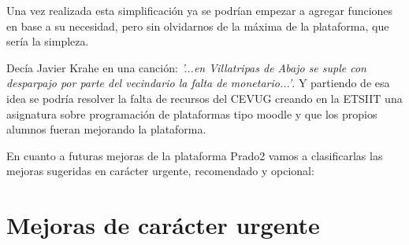 \bigskip
Una vez realizada esta simplificación ya se podrían empezar a agregar funciones en base a su necesidad, pero sin olvidarnos de la máxima de la plataforma, que sería la simpleza. 

\bigskip
Decía Javier Krahe en una canción: \textit{'...en Villatripas de Abajo se suple con desparpajo por parte del vecindario la falta de monetario...'}. Y partiendo de esa idea se podría resolver la falta de recursos del CEVUG creando en la ETSIIT una asignatura sobre programación de plataformas tipo moodle y que los propios alumnos fueran mejorando la plataforma. 

\newpage
En cuanto a futuras mejoras de la plataforma Prado2 vamos a clasificarlas las mejoras sugeridas en carácter urgente, recomendado y opcional:

\section{Mejoras de carácter urgente}

